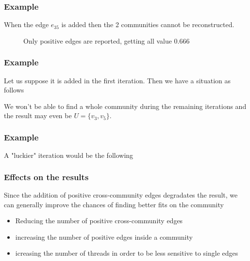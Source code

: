 \documentclass{beamer}
\begin{document}
\begin{frame}[c]
	\frametitle{Example}
	When the edge $e_{35}$ is added then the 2 communities cannot be
	reconstructed.

	\begin{figure}[htpb]
		\centering
		\caption{Only positive edges are reported, getting all value
			0.666}%
		\label{fig:name}
	\end{figure}
\end{frame}

\begin{frame}[c]
	\frametitle{Example}
	Let us suppose it is added in the first iteration. Then we have a situation
	as follows

	\begin{figure}[htpb]
		\centering
	\end{figure}

	We won't be able to find a whole community during the remaining iterations
	and the result may even be $U = \{ v_{3}, v_5\}$.
\end{frame}

\begin{frame}[c]
	\frametitle{Example}
	A "luckier" iteration would be the following

	\begin{figure}[htpb]
		\centering
	\end{figure}
\end{frame}

\begin{frame}[c]
	\frametitle{Effects on the results}
	Since the addition of positive cross-community edges degradates the result,
	we can generally improve the chances of finding better fits on the
	community

	\begin{itemize}
		\item Reducing the number of positive cross-community edges
		\item increasing the number of positive edges inside a community
		\item icreasing the number of threads in order to be less sensitive
		      to single edges
	\end{itemize}

\end{frame}
\end{document}
